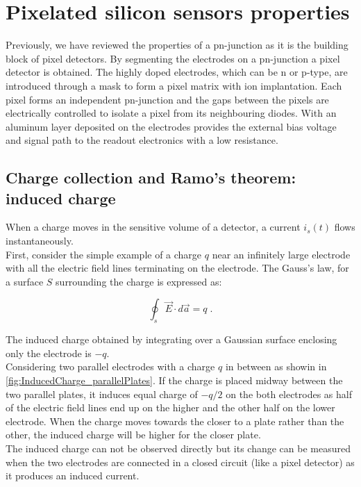 \section{Pixelated silicon sensors properties}

Previously, we have reviewed the properties of a pn-junction as it is
the building block of pixel detectors. By segmenting the electrodes on
a pn-junction a pixel detector is obtained. The highly doped
electrodes, which can be n or p-type, are introduced through a mask to
form a pixel matrix with ion implantation. Each pixel forms an
independent pn-junction and the gaps between the pixels are
electrically controlled to isolate a pixel from its neighbouring
diodes. With an aluminum layer deposited on the electrodes provides
the external bias voltage and signal path to the readout electronics
with a low resistance.


\subsection{Charge collection and Ramo's theorem: induced charge}\label{sec:RamoTheorem}
When a charge moves in the sensitive volume of a detector, a current
$i_s(t)$ flows instantaneously. \\ 
First, consider the simple example of a charge $q$ near an infinitely
large electrode with all the electric field lines terminating on the
electrode. The Gauss's law, for a surface $S$ surrounding the charge
is expressed as:

\begin{equation}
\oint_{s} \vec{E} \cdot d\vec{a}=q\; .
\label{eq:GaussLaw}
\end{equation}

The induced charge obtained by integrating over a Gaussian surface
enclosing only the electrode is $-q$. \\
Considering two parallel electrodes with a charge $q$ in between as
showin in \cref{fig:InducedCharge_parallelPlates}. If the charge
is placed midway between the two parallel plates, it induces equal
charge of $-q/2$ on the both electrodes as half of the electric field
lines end up on the higher and the other half on the lower
electrode. When the charge moves towards the closer to a plate rather
than the other, the induced charge will be higher for the closer
plate. \\
The induced charge can not be observed directly but its change can be
measured when the two electrodes are connected in a closed circuit
(like a pixel detector) as it produces an induced current.

